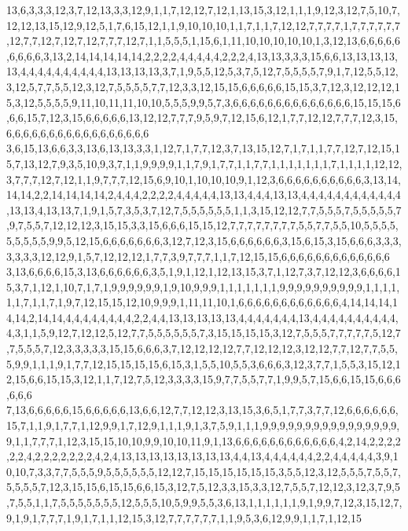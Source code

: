 13,6,3,3,3,12,3,7,12,13,3,3,12,9,1,1,7,12,12,7,12,1,13,15,3,12,1,1,1,9,12,3,12,7,5,10,7,12,12,13,15,12,9,12,5,1,7,6,15,12,1,1,9,10,10,10,1,1,7,1,1,7,12,12,7,7,7,7,1,7,7,7,7,7,7,12,7,7,12,7,12,7,12,7,7,7,12,7,1,1,5,5,5,1,15,6,1,11,10,10,10,10,10,1,3,12,13,6,6,6,6,6,6,6,6,6,3,13,2,14,14,14,14,14,2,2,2,2,4,4,4,4,4,2,2,2,4,13,13,3,3,3,15,6,6,13,13,13,13,13,4,4,4,4,4,4,4,4,4,4,13,13,13,13,3,7,1,9,5,5,12,5,3,7,5,12,7,5,5,5,5,7,9,1,7,12,5,5,12,3,12,5,7,7,5,5,12,3,12,7,5,5,5,5,7,7,12,3,3,12,15,15,6,6,6,6,6,15,15,3,7,12,3,12,12,12,15,3,12,5,5,5,5,9,11,10,11,11,10,10,5,5,5,9,9,5,7,3,6,6,6,6,6,6,6,6,6,6,6,6,6,6,15,15,15,6,6,6,15,7,12,3,15,6,6,6,6,6,13,12,12,7,7,7,9,5,9,7,12,15,6,12,1,7,7,12,12,7,7,7,12,3,15,6,6,6,6,6,6,6,6,6,6,6,6,6,6,6,6,6
3,6,15,13,6,6,3,3,13,6,13,13,3,3,1,12,7,1,7,7,12,3,7,13,15,12,7,1,7,1,1,7,7,12,7,12,15,15,7,13,12,7,9,3,5,10,9,3,7,1,1,9,9,9,9,1,1,7,9,1,7,7,1,1,7,7,1,1,1,1,1,1,1,7,1,1,1,1,12,12,3,7,7,7,12,7,12,1,1,9,7,7,7,12,15,6,9,10,1,10,10,10,9,1,12,3,6,6,6,6,6,6,6,6,6,6,3,13,14,14,14,2,2,14,14,14,14,2,4,4,4,2,2,2,2,4,4,4,4,4,13,13,4,4,4,13,13,4,4,4,4,4,4,4,4,4,4,4,4,13,13,4,13,13,7,1,9,1,5,7,3,5,3,7,12,7,5,5,5,5,5,5,1,1,3,15,12,12,7,7,5,5,5,7,5,5,5,5,5,7,9,7,5,5,7,12,12,12,3,15,15,3,3,15,6,6,6,15,15,12,7,7,7,7,7,7,7,7,5,5,7,7,5,5,10,5,5,5,5,5,5,5,5,5,9,9,5,12,15,6,6,6,6,6,6,6,3,12,7,12,3,15,6,6,6,6,6,6,3,15,6,15,3,15,6,6,6,3,3,3,3,3,3,3,12,12,9,1,5,7,12,12,12,1,7,7,3,9,7,7,7,1,1,7,12,15,15,6,6,6,6,6,6,6,6,6,6,6,6,6
3,13,6,6,6,6,15,3,13,6,6,6,6,6,6,3,5,1,9,1,12,1,12,13,15,3,7,1,12,7,3,7,12,12,3,6,6,6,6,15,3,7,1,12,1,10,7,1,7,1,9,9,9,9,9,9,1,9,10,9,9,9,1,1,1,1,1,1,1,9,9,9,9,9,9,9,9,9,9,1,1,1,1,1,1,7,1,1,7,1,9,7,12,15,15,12,10,9,9,9,1,11,11,10,1,6,6,6,6,6,6,6,6,6,6,6,6,4,14,14,14,14,14,2,14,14,4,4,4,4,4,4,4,4,2,2,4,4,13,13,13,13,13,4,4,4,4,4,4,4,13,4,4,4,4,4,4,4,4,4,4,4,3,1,1,5,9,12,7,12,12,5,12,7,7,5,5,5,5,5,5,7,3,15,15,15,15,3,12,7,5,5,5,7,7,7,7,7,5,12,7,7,5,5,5,7,12,3,3,3,3,3,15,15,6,6,6,3,7,12,12,12,12,7,7,12,12,12,3,12,12,7,7,12,7,7,5,5,5,9,9,1,1,1,9,1,7,7,12,15,15,15,15,6,15,3,1,5,5,10,5,5,3,6,6,6,3,12,3,7,7,1,5,5,3,15,12,12,15,6,6,15,15,3,12,1,1,7,12,7,5,12,3,3,3,3,15,9,7,7,5,5,7,7,1,9,9,5,7,15,6,6,15,15,6,6,6,6,6,6
7,13,6,6,6,6,6,15,6,6,6,6,6,13,6,6,12,7,7,12,12,3,13,15,3,6,5,1,7,7,3,7,7,12,6,6,6,6,6,6,15,7,1,1,9,1,7,7,1,12,9,9,1,7,12,9,1,1,1,9,1,3,7,5,9,1,1,1,9,9,9,9,9,9,9,9,9,9,9,9,9,9,9,9,9,1,1,7,7,7,1,12,3,15,15,10,10,9,9,10,10,11,9,1,13,6,6,6,6,6,6,6,6,6,6,6,6,4,2,14,2,2,2,2,2,2,4,2,2,2,2,2,2,2,4,2,4,13,13,13,13,13,13,13,13,4,4,13,4,4,4,4,4,4,2,2,4,4,4,4,4,3,9,10,10,7,3,3,7,7,5,5,5,9,5,5,5,5,5,5,12,12,7,15,15,15,15,15,15,3,5,5,12,3,12,5,5,5,7,5,5,7,5,5,5,5,7,12,3,15,15,6,15,15,6,6,15,3,12,7,5,12,3,3,15,3,3,12,7,5,5,7,12,12,3,12,3,7,9,5,7,5,5,1,1,7,5,5,5,5,5,5,5,12,5,5,5,10,5,9,9,5,5,3,6,13,1,1,1,1,1,1,9,1,9,9,7,12,3,15,12,7,9,1,9,1,7,7,7,1,9,1,7,1,1,12,15,3,12,7,7,7,7,7,7,1,1,9,5,3,6,12,9,9,1,1,7,1,12,15
